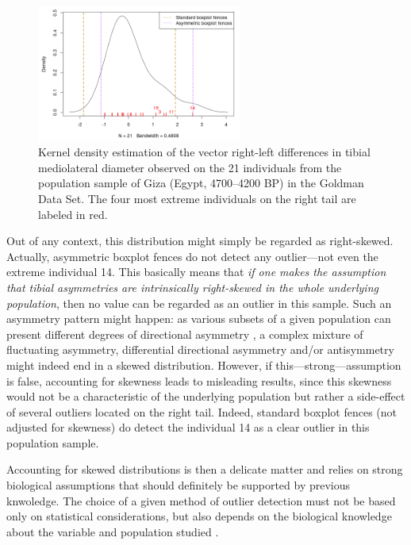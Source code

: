 \documentclass[review, 3p]{elsarticle}
\begin{document}
\begin{figure}[htbp]
\centering
\includegraphics[width=0.6\textwidth]{figures/skewness.png}
\caption{\label{fig:org47184de}Kernel density estimation of the vector right-left differences in tibial mediolateral diameter observed on the 21 individuals from the population sample of Giza (Egypt, 4700--4200 BP) in the Goldman Data Set. The four most extreme individuals on the right tail are labeled in red.}
\end{figure}

Out of any context, this distribution might simply be regarded as right-skewed. Actually, asymmetric boxplot fences do not detect any outlier---not even the extreme individual 14. This basically means that \emph{if one makes the assumption that tibial asymmetries are intrinsically right-skewed in the whole underlying population}, then no value can be regarded as an outlier in this sample. Such an asymmetry pattern might happen: as various subsets of a given population can present different degrees of directional asymmetry \citep{graham2016_FluctuatingAsymmetryHuman}, a complex mixture of fluctuating asymmetry, differential directional asymmetry and/or antisymmetry might indeed end in a skewed distribution. However, if this---strong---assumption is false, accounting for skewness leads to misleading results, since this skewness would not be a characteristic of the underlying population but rather a side-effect of several outliers located on the right tail. Indeed, standard boxplot fences (not adjusted for skewness) do detect the individual 14 as a clear outlier in this population sample.

Accounting for skewed distributions is then a delicate matter and relies on strong biological assumptions that should definitely be supported by previous knwoledge. The choice of a given method of outlier detection must not be based only on statistical considerations, but also depends on the biological knowledge about the variable and population studied \citep{leys2019_HowClassifyDetect}.
\end{document}
